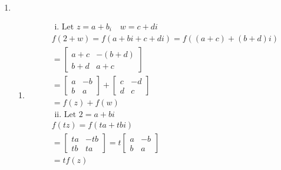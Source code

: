 \documentclass[11pt]{article}
\begin{document}
\begin{enumerate}[{\bf Q1.}]
		\item
		\begin{enumerate}
			\item 
			\begin{equation}
				\begin{aligned}
				& \text { i. Let } z=a+b_i \quad w=c + d i \\
				& f(2+w)=f(a+b i+c+d i)=f((a+c)+(b+d) i) \\
				& =\left[\begin{array}{cc}
				a+c & -(b+d) \\
				b+d & a+c
				\end{array}\right] \\
				& =\left[\begin{array}{cc}
				a & -b \\
				b & a
				\end{array}\right]+\left[\begin{array}{cc}
				c & -d \\
				d & c
				\end{array}\right] \\
				& =f(z)+f(w) \\
				& \text { ii. Let } 2=a+b i \\
				& f(t z)=f(t a+t b i) \\
				& =\left[\begin{array}{cc}
				t a & -t b \\
				t b & t a
				\end{array}\right]=t\left[\begin{array}{cc}
				a & -b \\
				b & a
				\end{array}\right] \\
				& =t f(z) \\
				&
				\end{aligned}
				\end{equation}


\end{enumerate}
\end{enumerate}
\end{document}
